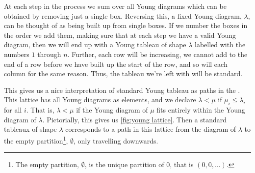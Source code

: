 \documentclass[fleqn]{NotesClass}
\begin{document}
    At each step in the process we sum over all Young diagrams which can be obtained by removing just a single box.
    Reversing this, a fixed Young diagram, \(\lambda\), can be thought of as being built up from single boxes.
    If we number the boxes in the order we add them, making sure that at each step we have a valid Young diagram, then we will end up with a Young tableau of shape \(\lambda\) labelled with the numbers \(1\) through \(n\).
    Further, each row will be increasing, we cannot add to the end of a row before we have built up the start of the row, and so will each column for the same reason.
    Thus, the tableau we're left with will be standard.
    
    This gives us a nice interpretation of standard Young tableau as paths in the .
    This lattice has all Young diagrams as elements, and we declare \(\lambda < \mu\) if \(\mu_i \le \lambda_i\) for all \(i\).
    That is, \(\lambda < \mu\) if the Young diagram of \(\mu\) fits entirely within the Young diagram of \(\lambda\).
    Pictorially, this gives us \cref{fig:young lattice}.
    Then a standard tableaux of shape \(\lambda\) corresponds to a path in this lattice from the diagram of \(\lambda\) to the empty partition\footnote{The empty partition, \(\emptyset\), is the unique partition of \(0\), that is \((0, 0, \dotsc)\).}, \(\emptyset\), only travelling downwards.
    
\end{document}
